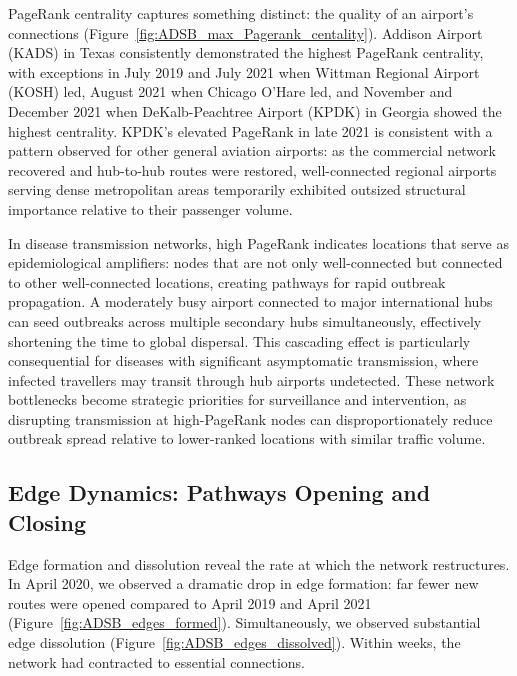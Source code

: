 \documentclass{elsarticle}
\begin{document}
PageRank centrality captures something distinct: the quality of an airport's connections (Figure~\ref{fig:ADSB_max_Pagerank_centality}). Addison Airport (KADS) in Texas consistently demonstrated the highest PageRank centrality, with exceptions in July 2019 and July 2021 when Wittman Regional Airport (KOSH) led, August 2021 when Chicago O'Hare led, and November and December 2021 when DeKalb-Peachtree Airport (KPDK) in Georgia showed the highest centrality. KPDK's elevated PageRank in late 2021 is consistent with a pattern observed for other general aviation airports: as the commercial network recovered and hub-to-hub routes were restored, well-connected regional airports serving dense metropolitan areas temporarily exhibited outsized structural importance relative to their passenger volume.

In disease transmission networks, high PageRank indicates locations that serve as epidemiological amplifiers: nodes that are not only well-connected but connected to other well-connected locations, creating pathways for rapid outbreak propagation. A moderately busy airport connected to major international hubs can seed outbreaks across multiple secondary hubs simultaneously, effectively shortening the time to global dispersal. This cascading effect is particularly consequential for diseases with significant asymptomatic transmission, where infected travellers may transit through hub airports undetected. These network bottlenecks become strategic priorities for surveillance and intervention, as disrupting transmission at high-PageRank nodes can disproportionately reduce outbreak spread relative to lower-ranked locations with similar traffic volume.


\subsection{Edge Dynamics: Pathways Opening and Closing}

Edge formation and dissolution reveal the rate at which the network restructures. In April 2020, we observed a dramatic drop in edge formation: far fewer new routes were opened compared to April 2019 and April 2021 (Figure~\ref{fig:ADSB_edges_formed}). Simultaneously, we observed substantial edge dissolution (Figure~\ref{fig:ADSB_edges_dissolved}). Within weeks, the network had contracted to essential connections.
\end{document}
